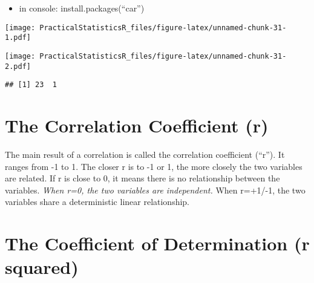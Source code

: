 \documentclass[]{article}
\newenvironment{Shaded}{\begin{snugshade}}{\end{snugshade}}
\newcommand{\DataTypeTok}[1]{\textcolor[rgb]{0.13,0.29,0.53}{#1}}
\newcommand{\DecValTok}[1]{\textcolor[rgb]{0.00,0.00,0.81}{#1}}
\newcommand{\KeywordTok}[1]{\textcolor[rgb]{0.13,0.29,0.53}{\textbf{#1}}}
\newcommand{\NormalTok}[1]{#1}
\newcommand{\OperatorTok}[1]{\textcolor[rgb]{0.81,0.36,0.00}{\textbf{#1}}}
\newcommand{\OtherTok}[1]{\textcolor[rgb]{0.56,0.35,0.01}{#1}}
\newcommand{\StringTok}[1]{\textcolor[rgb]{0.31,0.60,0.02}{#1}}
\providecommand{\tightlist}{%
  \setlength{\itemsep}{0pt}\setlength{\parskip}{0pt}}
\begin{document}
\begin{itemize}
\tightlist
\item
  in console: install.packages(``car'')
\end{itemize}

\begin{Shaded}
\end{Shaded}

\texttt{[image: PracticalStatisticsR\_files/figure-latex/unnamed-chunk-31-1.pdf]}

\begin{Shaded}
\end{Shaded}

\texttt{[image: PracticalStatisticsR\_files/figure-latex/unnamed-chunk-31-2.pdf]}

\begin{verbatim}
## [1] 23  1
\end{verbatim}

\hypertarget{the-correlation-coefficient-r}{%
\section{The Correlation Coefficient
(r)}\label{the-correlation-coefficient-r}}

The main result of a correlation is called the correlation coefficient
(``r''). It ranges from -1 to 1. The closer r is to -1 or 1, the more
closely the two variables are related. If r is close to 0, it means
there is no relationship between the variables. \emph{When r=0, the two
variables are independent. }When r=+1/-1, the two variables share a
deterministic linear relationship.

\hypertarget{the-coefficient-of-determination-r-squared}{%
\section{The Coefficient of Determination (r
squared)}\label{the-coefficient-of-determination-r-squared}}
\end{document}
